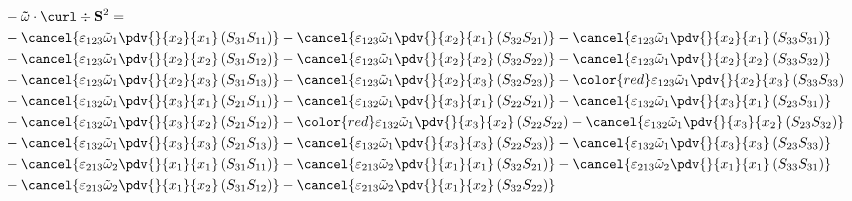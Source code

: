 \begin{equation}
	\begin{split}
&-\mathbf{\tilde{\omega}}\cdot\curl \div \mathbf{S}^2 =  \\ &		-\cancel{\varepsilon_{123}\tilde{\omega}_{1}\pdv{}{x_{2}}{x_{1}}\left(S_{31}S_{11}\right)}
		-\cancel{\varepsilon_{123}\tilde{\omega}_{1}\pdv{}{x_{2}}{x_{1}}\left(S_{32}S_{21}\right)}
		-\cancel{\varepsilon_{123}\tilde{\omega}_{1}\pdv{}{x_{2}}{x_{1}}\left(S_{33}S_{31}\right)}\\
&		-\cancel{\varepsilon_{123}\tilde{\omega}_{1}\pdv{}{x_{2}}{x_{2}}\left(S_{31}S_{12}\right)}
		-\cancel{\varepsilon_{123}\tilde{\omega}_{1}\pdv{}{x_{2}}{x_{2}}\left(S_{32}S_{22}\right)}
		-\cancel{\varepsilon_{123}\tilde{\omega}_{1}\pdv{}{x_{2}}{x_{2}}\left(S_{33}S_{32}\right)}\\
&		-\cancel{\varepsilon_{123}\tilde{\omega}_{1}\pdv{}{x_{2}}{x_{3}}\left(S_{31}S_{13}\right)}
		-\cancel{\varepsilon_{123}\tilde{\omega}_{1}\pdv{}{x_{2}}{x_{3}}\left(S_{32}S_{23}\right)}
		-{\color{red}\varepsilon_{123}\tilde{\omega}_{1}\pdv{}{x_{2}}{x_{3}}\left(S_{33}S_{33}\right)}\\
&		-\cancel{\varepsilon_{132}\tilde{\omega}_{1}\pdv{}{x_{3}}{x_{1}}\left(S_{21}S_{11}\right)}
		-\cancel{\varepsilon_{132}\tilde{\omega}_{1}\pdv{}{x_{3}}{x_{1}}\left(S_{22}S_{21}\right)}
		-\cancel{\varepsilon_{132}\tilde{\omega}_{1}\pdv{}{x_{3}}{x_{1}}\left(S_{23}S_{31}\right)}\\
&		-\cancel{\varepsilon_{132}\tilde{\omega}_{1}\pdv{}{x_{3}}{x_{2}}\left(S_{21}S_{12}\right)}
		-{\color{red}\varepsilon_{132}\tilde{\omega}_{1}\pdv{}{x_{3}}{x_{2}}\left(S_{22}S_{22}\right)}
		-\cancel{\varepsilon_{132}\tilde{\omega}_{1}\pdv{}{x_{3}}{x_{2}}\left(S_{23}S_{32}\right)}\\
&		-\cancel{\varepsilon_{132}\tilde{\omega}_{1}\pdv{}{x_{3}}{x_{3}}\left(S_{21}S_{13}\right)}
		-\cancel{\varepsilon_{132}\tilde{\omega}_{1}\pdv{}{x_{3}}{x_{3}}\left(S_{22}S_{23}\right)}
		-\cancel{\varepsilon_{132}\tilde{\omega}_{1}\pdv{}{x_{3}}{x_{3}}\left(S_{23}S_{33}\right)}\\
&		-\cancel{\varepsilon_{213}\tilde{\omega}_{2}\pdv{}{x_{1}}{x_{1}}\left(S_{31}S_{11}\right)}
		-\cancel{\varepsilon_{213}\tilde{\omega}_{2}\pdv{}{x_{1}}{x_{1}}\left(S_{32}S_{21}\right)}
		-\cancel{\varepsilon_{213}\tilde{\omega}_{2}\pdv{}{x_{1}}{x_{1}}\left(S_{33}S_{31}\right)}\\
&		-\cancel{\varepsilon_{213}\tilde{\omega}_{2}\pdv{}{x_{1}}{x_{2}}\left(S_{31}S_{12}\right)}
		-\cancel{\varepsilon_{213}\tilde{\omega}_{2}\pdv{}{x_{1}}{x_{2}}\left(S_{32}S_{22}\right)}

\end{split}
\end{equation}
